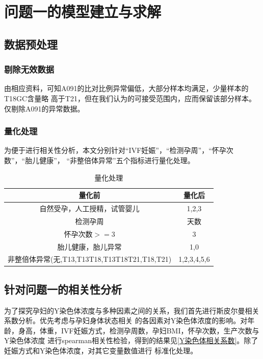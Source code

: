 \documentclass[withoutpreface,notoc]{cumcmthesis}
\begin{document}
	
	\section{问题一的模型建立与求解}

	\subsection{数据预处理}

	\subsubsection{剔除无效数据}
	由相应资料，可知A091的比对比例异常偏低，大部分样本均满足，少量样本的T18GC含量略
	高于T21，但在我们认为的可接受范围内，应而保留该部分样本。仅剔除A091的异常数据。

	\subsubsection{量化处理}
	为便于进行相关性分析，本文分别针对“IVF妊娠”，“检测孕周”，“怀孕次数”，“胎儿健康”，
	“非整倍体异常”五个指标进行量化处理。


	\begin{table}[H]
		\centering
		\caption{量化处理}
		\label{量化处理}
		\begin{tabularx}{\textwidth}{cc}
			\toprule
			\textbf{量化前} & \textbf{量化后} \\
			\midrule
			自然受孕，人工授精，试管婴儿     & 1,2,3 \\
			检测孕周      & 天数 \\
			怀孕次数$>=3$      & 3 \\
			胎儿健康，胎儿异常     & 1,0 \\
			非整倍体异常(无,T13,T13T18,T13T18T21,T18,T21) & 1,2,3,4,5,6 \\
			\bottomrule
		\end{tabularx}
	\end{table}


	\subsection{针对问题一的相关性分析}

	为了探究孕妇的Y染色体浓度与多种因素之间的关系，我们首先进行斯皮尔曼相关系数分析。优先考虑与孕妇身体状态相关
	的各因素对Y染色体浓度的影响。对年龄，身高，体重，IVF妊娠方式，检测孕周数，孕妇BMI，怀孕次数，生产次数与Y染色体浓度
	进行spearman相关性检验，得到的结果见\cref{Y染色体相关系数}。除了妊娠方式和Y染色体浓度，对其它变量数值进行
	标准化处理。
\end{document}

